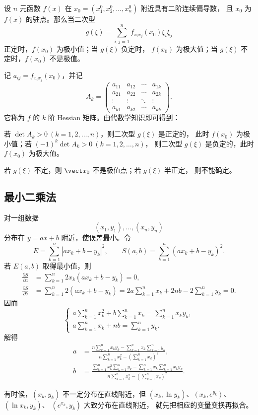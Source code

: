 \begin{theorem}
设 $n$ 元函数 $f(x)$ 在
$x_0=(x_1^0,x_2^0,\ldots,x_n^0)$ 附近具有二阶连续偏导数，
且 $x_0$ 为 $f(x)$ 的驻点。那么当二次型
\[
g(\xi)=\sum_{i,j=1}^{n}f_{x_i x_j}(x_0)\xi_i\xi_j
\]
正定时，$f(x_0)$ 为极小值；当 $g(\xi)$ 负定时，
$f(x_0)$ 为极大值；当 $g(\xi)$ 不定时，$f(x_0)$ 不是极值。
\end{theorem}

记 $a_{ij}=f_{x_i x_j}(x_0)$，并记
\[
A_k=
\begin{pmatrix}
a_{11}&a_{12}&\cdots&a_{1k}\\
a_{21}&a_{22}&\cdots&a_{2k}\\
\vdots&\vdots&\ddots&\vdots\\
a_{k1}&a_{k2}&\cdots&a_{kk}
\end{pmatrix}.
\]
它称为 $f$ 的 $k$ 阶 Hessian 矩阵。由代数学知识即可得到：

\begin{corollary}
若 $\det A_k>0\ (k=1,2,\ldots,n)$，则二次型 $g(\xi)$ 是正定的，
此时 $f(x_0)$ 为极小值；若
$(-1)^k\det A_k>0\ (k=1,2,\ldots,n)$，
则二次型 $g(\xi)$ 是负定的，此时 $f(x_0)$ 为极大值。
\end{corollary}

若 $g(\xi)$ 不定，则 $\vect x_0$ 不是极值点；若 $g(\xi)$ 半正定，
则不能确定。

\subsection*{最小二乘法}

对一组数据
\[
(x_1,y_1),\ldots,(x_n,y_n)
\]
分布在 $y=ax+b$ 附近，使误差最小。令
\[
E=\sum_{k=1}^{n}|ax_k+b-y_k|^2,
\qquad
S(a,b)=\sum_{k=1}^{n}(ax_k+b-y_k)^2.
\]
若 $E(a,b)$ 取得最小值，则
\[
\begin{aligned}
\frac{\partial S}{\partial a}
&=\sum_{k=1}^{n}2x_k(ax_k+b-y_k)=0,\\
\frac{\partial S}{\partial b}
&=\sum_{k=1}^{n}2(ax_k+b-y_k)
 =2a\sum_{k=1}^{n}x_k+2nb-2\sum_{k=1}^{n}y_k=0.
\end{aligned}
\]
因而
\[
\begin{cases}
a\displaystyle\sum_{k=1}^{n}x_k^2
 +b\displaystyle\sum_{k=1}^{n}x_k
 =\displaystyle\sum_{k=1}^{n}x_ky_k,\\[6pt]
a\displaystyle\sum_{k=1}^{n}x_k+nb
 =\displaystyle\sum_{k=1}^{n}y_k.
\end{cases}
\]
解得
\[
\begin{aligned}
a&=
\frac{
n\displaystyle\sum_{k=1}^{n}x_ky_k
-\displaystyle\sum_{k=1}^{n}x_k\sum_{k=1}^{n}y_k
}{
n\displaystyle\sum_{k=1}^{n}x_k^2
-\left(\displaystyle\sum_{k=1}^{n}x_k\right)^2
},\\[8pt]
b&=
\frac{
\displaystyle\sum_{k=1}^{n}x_k^2\sum_{k=1}^{n}y_k
-\displaystyle\sum_{k=1}^{n}x_k\sum_{k=1}^{n}x_ky_k
}{
n\displaystyle\sum_{k=1}^{n}x_k^2
-\left(\displaystyle\sum_{k=1}^{n}x_k\right)^2
}.
\end{aligned}
\]

有时候，$(x_k,y_k)$ 不一定分布在直线附近，但
$(x_k,\ln y_k)$、$(x_k,e^{y_k})$、$(\ln x_k,y_k)$、
$(e^{x_k},y_k)$ 大致分布在直线附近，
就先把相应的变量变换再拟合。

